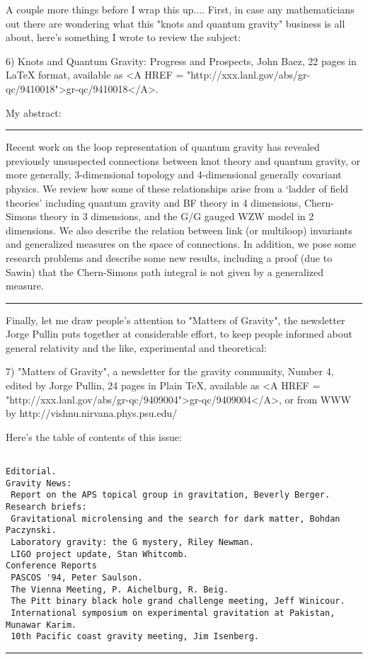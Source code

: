 A couple more things before I wrap this up....  First, in case any
mathematicians out there are wondering what this "knots and quantum
gravity" business is all about, here's something I wrote to review the
subject: 

6) Knots and Quantum Gravity: Progress and Prospects, John Baez, 22
pages in LaTeX format, available as <A HREF = "http://xxx.lanl.gov/abs/gr-qc/9410018">gr-qc/9410018</A>.

My abstract:

\par\noindent\rule{\textwidth}{0.4pt}
Recent work on the loop representation of quantum gravity has revealed
previously unsuspected connections between knot theory and quantum
gravity, or more generally, 3-dimensional topology and 4-dimensional
generally covariant physics.  We review how some of these relationships
arise from a `ladder of field theories' including quantum gravity and BF
theory in 4 dimensions, Chern-Simons theory in 3 dimensions, and the G/G
gauged WZW model in 2 dimensions.  We also describe the relation between
link (or multiloop) invariants and generalized measures on the space of
connections.  In addition, we pose some research problems and describe
some new results, including a proof (due to Sawin) that the Chern-Simons
path integral is not given by a generalized measure.
\par\noindent\rule{\textwidth}{0.4pt}

Finally, let me draw people's attention to "Matters of Gravity", the 
newsletter Jorge Pullin puts together at considerable effort, to keep
people informed about general relativity and the like, experimental and
theoretical:

7) "Matters of Gravity", a newsletter for the gravity community, Number
4, edited by Jorge Pullin, 24 pages in Plain TeX, available as
<A HREF = "http://xxx.lanl.gov/abs/gr-qc/9409004">gr-qc/9409004</A>, or from WWW by http://vishnu.nirvana.phys.psu.edu/ 

Here's the table of contents of this issue:


\begin{verbatim}

Editorial.
Gravity News:
 Report on the APS topical group in gravitation, Beverly Berger.
Research briefs:
 Gravitational microlensing and the search for dark matter, Bohdan Paczynski.
 Laboratory gravity: the G mystery, Riley Newman.
 LIGO project update, Stan Whitcomb.
Conference Reports
 PASCOS '94, Peter Saulson.
 The Vienna Meeting, P. Aichelburg, R. Beig.
 The Pitt binary black hole grand challenge meeting, Jeff Winicour.
 International symposium on experimental gravitation at Pakistan, 
Munawar Karim.
 10th Pacific coast gravity meeting, Jim Isenberg.
\end{verbatim}
    
\par\noindent\rule{\textwidth}{0.4pt}

